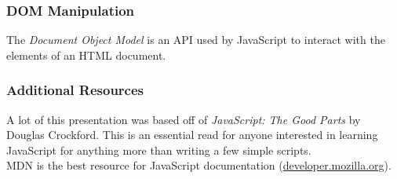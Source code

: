 \documentclass{lug}
\begin{document}
\begin{frame}
    \frametitle{DOM Manipulation}

    The \textit{Document Object Model} is an API used by JavaScript to interact with the elements of
    an HTML document.\footnotemark[1]

\end{frame}

\begin{frame}
    \frametitle{Additional Resources}

    A lot of this presentation was based off of \textit{JavaScript: The Good Parts} by Douglas
    Crockford. This is an essential read for anyone interested in learning JavaScript for anything
    more than writing a few simple scripts.\\

    MDN is the best resource for JavaScript documentation
    (\href{https://developer.mozilla.org/en-US/}{developer.mozilla.org}).
\end{frame}
\end{document}

